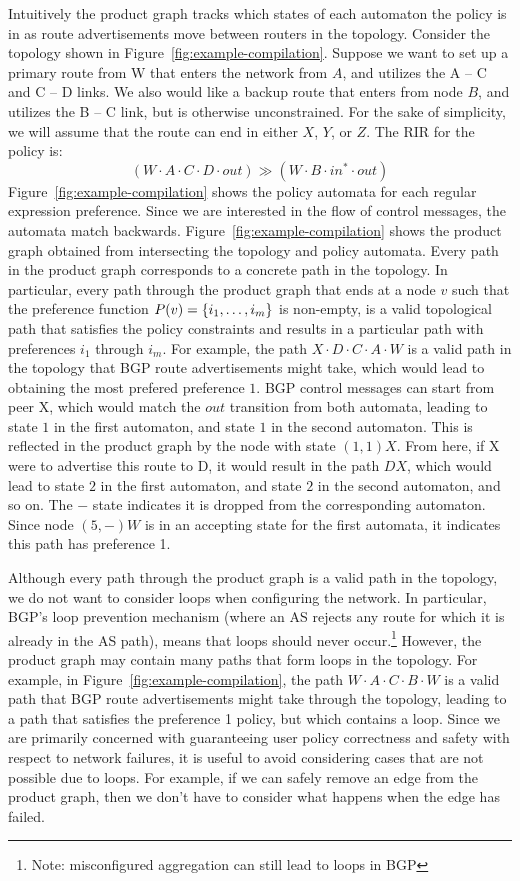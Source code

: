 Intuitively the product graph tracks which states of each automaton the policy is in as route advertisements move between routers in the topology.
%
Consider the topology shown in Figure~\ref{fig:example-compilation}. Suppose we want to set up a primary route from W that enters the network from $A$, and utilizes the A -- C and C -- D links. We also would like a backup route that enters from node $B$, and utilizes the B -- C link, but is otherwise unconstrained. For the sake of simplicity, we will assume that the route can end in either $X$, $Y$, or $Z$. The RIR for the policy is:
%
$$(W \cdot A \cdot C \cdot D \cdot out) \gg (W \cdot B \cdot in^* \cdot out)$$
%
Figure~\ref{fig:example-compilation} shows the policy automata for each regular expression preference. Since we are interested in the flow of control messages, the automata match backwards.
%
Figure~\ref{fig:example-compilation} shows the product graph obtained from intersecting the topology and policy automata. Every path in the product graph corresponds to a concrete path in the topology. In particular, every path through the product graph that ends at a node $v$ such that the preference function $P(v) = \{ i_1, \dots, i_m \} $ is non-empty, is a valid topological path that satisfies the policy constraints and results in a particular path with preferences $i_1$ through $i_m$.
%
For example, the path $X \cdot D \cdot C \cdot A \cdot W$ is a valid path in the topology that BGP route advertisements might take, which would lead to obtaining the most prefered preference $1$.
BGP control messages can start from peer X, which would match the $out$ transition from both automata, leading to state $1$ in the first automaton, and state $1$ in the second automaton. This is reflected in the product graph by the node with state $(1,1) X$. From here, if X were to advertise this route to D, it would result in the path $D X$, which would lead to state $2$ in the first automaton, and state $2$ in the second automaton, and so on. The $-$ state indicates it is dropped from the corresponding automaton. Since node $(5,-) W$ is in an accepting state for the first automata, it indicates this path has preference 1.


Although every path through the product graph is a valid path in the topology, we do not want to consider loops when configuring the network. In particular, BGP's loop prevention mechanism (where an AS rejects any route for which it is already in the AS path), means that loops should never occur.\footnote{Note: misconfigured aggregation can still lead to loops in BGP}
%
However, the product graph may contain many paths that form loops in the topology. For example, in Figure~\ref{fig:example-compilation}, the path $W \cdot A \cdot C \cdot B \cdot W$ is a valid path that BGP route advertisements might take through the topology, leading to a path that satisfies the preference 1 policy, but which contains a loop.
%
Since we are primarily concerned with guaranteeing user policy correctness and safety with respect to network failures, it is useful to avoid considering cases that are not possible due to loops. For example, if we can safely remove an edge from the product graph, then we don't have to consider what happens when the edge has failed.


